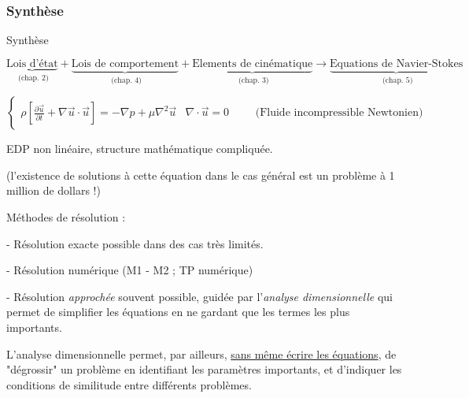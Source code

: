 \subsubsection{Synthèse}
\begin{frame}{Synthèse}  
\small

$$
\underbrace{\mbox{Lois d'état}}_{\mbox{ (chap. 2)}}  + \underbrace{\mbox{Lois de comportement}}_{\mbox{ (chap. 4)}} + 
\underbrace{\mbox{Elements de cinématique}}_{\mbox{ (chap. 3)}} 
\rightarrow \underbrace{\mbox{Equations de Navier-Stokes}}_{\mbox{ (chap. 5)}}
$$



\medskip \pause 

$$
\left\{\begin{array}{c}
\displaystyle
 \rho \left[ \frac{\partial \vec{u}}{\partial t} 
+ \nabla  \vec{u} \cdot \vec{u} \right] =
- \nabla p + \mu \nabla^2 \vec{u}
& 
\displaystyle
\nabla \cdot \vec{u} = 0
\end{array}
\right.
\qquad \mbox{(Fluide incompressible Newtonien)}
$$





\medskip \pause 



EDP non linéaire, structure mathématique compliquée. 

(l'existence de solutions à cette équation dans le cas général est un problème à 1 million de dollars !)

\medskip \pause 

Méthodes de résolution :

\pause
- Résolution exacte possible dans des cas très limités.

\pause
- Résolution numérique (M1 - M2 ; TP numérique) 

\pause
- Résolution {\em approchée } souvent possible, guidée par l'{\em analyse dimensionnelle } qui permet de simplifier les équations en ne gardant que les
 termes les plus importants.




\medskip
\pause

L'analyse dimensionnelle permet, par ailleurs, \underline{sans même écrire les équations}, de "dégrossir" un problème en identifiant les paramètres importants, et d'indiquer les conditions de similitude entre différents problèmes.

\end{frame}



